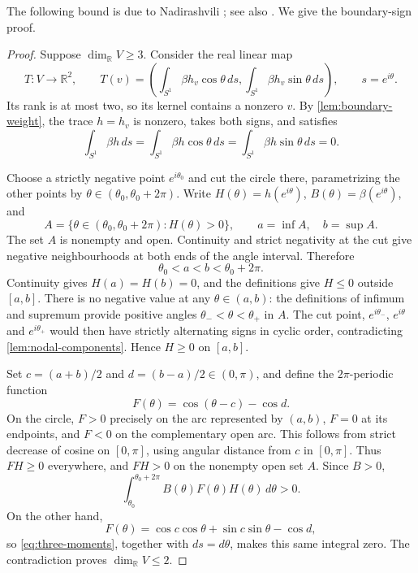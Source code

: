The following bound is due to Nadirashvili
\cite[Theorem 3, p.~227]{Nadirashvili}; see also
\cite[Proposition 2.5]{BanuelosBurdzy}. We give the boundary-sign proof.

\begin{proof}
Suppose $\dim_{\mathbb R}V\ge3$. Consider the real linear map
\[
 T:V\to\mathbb R^2,\qquad
 T(v)=\left(\int_{S^1}\beta h_v\cos\theta\,ds,
             \int_{S^1}\beta h_v\sin\theta\,ds\right),
 \qquad s=e^{i\theta}.
\]
Its rank is at most two, so its kernel contains a nonzero $v$.
By \cref{lem:boundary-weight}, the trace $h=h_v$ is nonzero, takes
both signs, and satisfies
\begin{equation}\label{eq:three-moments}
 \int_{S^1}\beta h\,ds
 =\int_{S^1}\beta h\cos\theta\,ds
 =\int_{S^1}\beta h\sin\theta\,ds=0.
\end{equation}

Choose a strictly negative point $e^{i\theta_0}$ and cut the circle
there, parametrizing the other points by
$\theta\in(\theta_0,\theta_0+2\pi)$. Write
$H(\theta)=h(e^{i\theta})$, $B(\theta)=\beta(e^{i\theta})$, and
\[
 A=\{\theta\in(\theta_0,\theta_0+2\pi):H(\theta)>0\},
 \qquad a=\inf A,\quad b=\sup A.
\]
The set $A$ is nonempty and open. Continuity and strict negativity at
the cut give negative neighbourhoods at both ends of the angle
interval. Therefore
\[
 \theta_0<a<b<\theta_0+2\pi.
\]
Continuity gives $H(a)=H(b)=0$, and the definitions give $H\le0$
outside $[a,b]$. There is no negative value at any
$\theta\in(a,b)$: the definitions of infimum and supremum provide
positive angles $\theta_-<\theta<\theta_+$ in $A$. The cut point,
$e^{i\theta_-}$, $e^{i\theta}$ and $e^{i\theta_+}$ would then have
strictly alternating signs in cyclic order, contradicting
\cref{lem:nodal-components}. Hence $H\ge0$ on $[a,b]$.

Set $c=(a+b)/2$ and $d=(b-a)/2\in(0,\pi)$, and define the
$2\pi$-periodic function
\[
 F(\theta)=\cos(\theta-c)-\cos d.
\]
On the circle, $F>0$ precisely on the arc represented by $(a,b)$,
$F=0$ at its endpoints, and $F<0$ on the complementary open arc.
This follows from strict decrease of cosine on $[0,\pi]$, using
angular distance from $c$ in $[0,\pi]$. Thus $FH\ge0$ everywhere,
and $FH>0$ on the nonempty open set $A$. Since $B>0$,
\[
 \int_{\theta_0}^{\theta_0+2\pi} B(\theta)F(\theta)H(\theta)\,d\theta>0.
\]
On the other hand,
\[
 F(\theta)=\cos c\cos\theta+\sin c\sin\theta-\cos d,
\]
so \cref{eq:three-moments}, together with $ds=d\theta$, makes this
same integral zero. The contradiction proves $\dim_{\mathbb R}V\le2$.
\end{proof}
